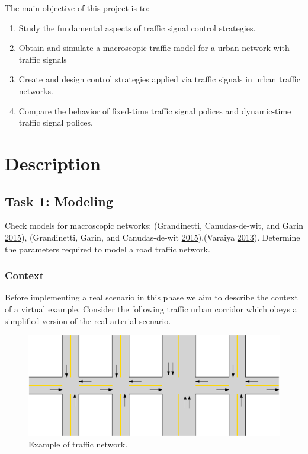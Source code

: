 \documentclass[]{book}
\providecommand{\tightlist}{%
  \setlength{\itemsep}{0pt}\setlength{\parskip}{0pt}}
\theoremstyle{definition}
\theoremstyle{definition}
\theoremstyle{definition}
\theoremstyle{remark}
\begin{document}
The main objective of this project is to:

\begin{enumerate}
\def\labelenumi{\arabic{enumi}.}
\tightlist
\item
  Study the fundamental aspects of traffic signal control strategies.
\item
  Obtain and simulate a macroscopic traffic model for a urban network
  with traffic signals
\item
  Create and design control strategies applied via traffic signals in
  urban traffic networks.
\item
  Compare the behavior of fixed-time traffic signal polices and
  dynamic-time traffic signal polices.
\end{enumerate}

\hypertarget{description}{%
\section*{Description}\label{description}}

\hypertarget{task-1-modeling}{%
\subsection*{Task 1: Modeling}\label{task-1-modeling}}

Check models for macroscopic networks: (Grandinetti, Canudas-de-wit, and
Garin \protect\hyperlink{ref-Grandinetti2015}{2015}), (Grandinetti,
Garin, and Canudas-de-wit
\protect\hyperlink{ref-Grandinetti2016}{2015}),(Varaiya
\protect\hyperlink{ref-Varaiya2013:TR-C}{2013}). Determine the
parameters required to model a road traffic network.

\hypertarget{context-1}{%
\subsubsection*{Context}\label{context-1}}

Before implementing a real scenario in this phase we aim to describe the
context of a virtual example. Consider the following traffic urban
corridor which obeys a simplified version of the real arterial scenario.



\begin{figure}

{\centering \includegraphics{images/p1-01-network} 

}

\caption{Example of traffic network.}\label{fig:city}
\end{figure}
\end{document}
